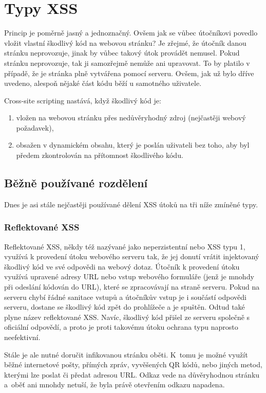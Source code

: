 \documentclass[11pt,conference, a4paper]{IEEEtran}
\begin{document}
\section{Typy XSS}
Princip je poměrně jasný a jednoznačný. Ovšem jak se vůbec útočníkovi povedlo vložit vlastní škodlivý kód na webovou stránku? Je zřejmé, že útočník danou stránku neprovozuje, jinak by vůbec takový útok provádět nemusel. Pokud stránku neprovozuje, tak ji samozřejmě nemůže ani upravovat. To by platilo v případě, že je stránka plně vytvářena pomocí serveru. Ovšem, jak už bylo dříve uvedeno, alespoň nějaké část kódu běží u samotného uživatele. 

Cross-site scripting nastává, když škodlivý kód je:
\begin{enumerate}
    \item vložen na webovou stránku přes nedůvěryhodný zdroj (nejčastěji webový požadavek),
    \item obsažen v dynamickém obsahu, který je poslán uživateli bez toho, aby byl předem zkontrolován na přítomnost škodlivého kódu.
\end{enumerate}

\subsection{Běžně používané rozdělení}
Dnes je asi stále nejčastěji používané dělení XSS útoků na tři níže zmíněné typy. 

\subsubsection{Reflektované XSS}
Reflektované XSS, někdy též nazývané jako neperzistentní nebo XSS typu 1, využívá k provedení útoku webového serveru tak, že jej donutí vrátit injektovaný škodlivý kód ve své odpovědi na webový dotaz. Útočník k provedení útoku využívá upravené adresy URL nebo vstup webového formuláře (jenž je mnohdy při odeslání kódován do URL), které se zpracovávají na straně serveru. Pokud na serveru chybí řádné sanitace vstupů a útočníkův vstup je i součástí odpovědi serveru, dostane se škodlivý kód zpět do prohlížeče a je spuštěn. Odtud také plyne název reflektované XSS. Navíc, škodlivý kód přišel ze serveru společně s oficiální odpovědí, a proto je proti takovému útoku ochrana typu  naprosto neefektivní. 

Stále je ale nutné doručit infikovanou stránku oběti. K~tomu je možné využít běžné internetové pošty, přímých zpráv, vyvěšených QR kódů, nebo jiných metod, kterými lze poslat či předat adresou URL. Odkaz vede na důvěryhodnou stránku a~oběť ani mnohdy netuší, že byla právě otevřením odkazu napadena.
\end{document}
